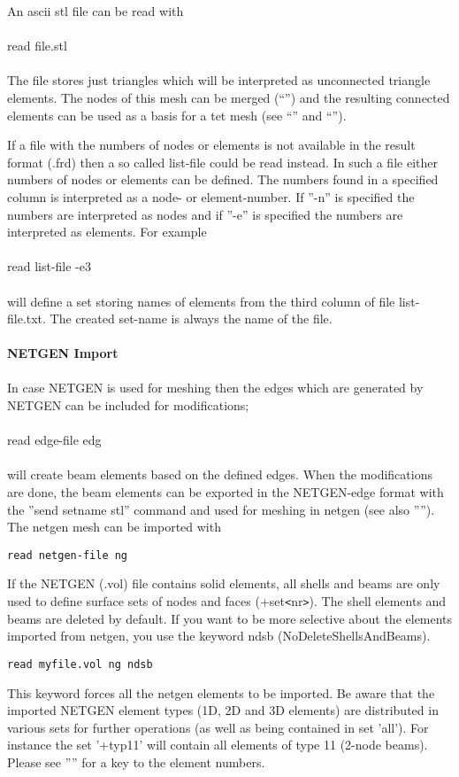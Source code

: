 \documentclass{article}
\begin{document}
An ascii stl file can be read with \\\\read file.stl\\\\ The file stores just triangles which will be interpreted as unconnected triangle elements. The nodes of this mesh can be merged (``'') and the resulting connected elements can be used as a basis for a tet mesh (see ``'' and ``'').

If a file with the numbers of nodes or elements is not available in the result format (.frd) then a so called list-file could be read instead. In such a file either numbers of nodes or elements can be defined. The numbers found in a specified column is interpreted as a node- or element-number. If ''-n'' is specified the numbers are interpreted as nodes and if ''-e'' is specified the numbers are interpreted as elements. For example\\\\read list-file -e3\\\\will define a set storing names of elements from the third column of file list-file.txt. The created set-name is always the name of the file.\\\\

\textbf{NETGEN Import}\\\\
In case NETGEN is used for meshing then the edges which are generated by NETGEN can be included for modifications;\\\\read edge-file edg\\\\will create beam elements based on the defined edges. When the modifications are done, the beam elements can be exported in the NETGEN-edge format with the ''send setname stl'' command and used for meshing in netgen (see also ''''). The netgen mesh can be imported with
\begin{verbatim}
read netgen-file ng
\end{verbatim}
If the NETGEN (.vol) file contains solid elements, all shells and beams are only used to define surface sets of nodes and faces (+set\verb_<_nr\verb_>_). The shell elements and beams are deleted by default. If you want to be more selective about the elements imported from netgen, you use the keyword ndsb (NoDeleteShellsAndBeams).
\begin{verbatim}
read myfile.vol ng ndsb
\end{verbatim}
This keyword forces all the netgen elements to be imported. Be aware that the imported NETGEN element types (1D, 2D and 3D elements) are distributed in various sets for further operations (as well as being contained in set 'all'). For instance the set '+typ11' will contain all elements of type 11 (2-node beams). Please see '''' for a key to the element numbers.\\\\
\end{document}
